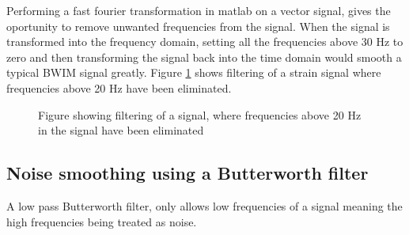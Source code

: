 Performing a fast fourier transformation in matlab on a vector signal, gives the oportunity to remove unwanted frequencies from the signal. When the signal is transformed into the frequency domain, setting all the frequencies above 30 Hz to zero and then transforming the signal back into the time domain would smooth a typical BWIM signal greatly.
Figure \ref{figure:filteredVSraw} shows filtering of a strain signal where frequencies above 20 Hz have been eliminated.
\begin{figure}[htpb]
	\begin{subfigure}[t]{0.9\textwidth}
		\centering
		
	\end{subfigure}
	\begin{subfigure}[t]{0.9\textwidth}
		\centering
		
	\end{subfigure}
	\caption{Figure showing filtering of a signal, where frequencies above 20 Hz in the signal have been eliminated }
	\label{figure:filteredVSraw}
\end{figure}
\subsection{Noise smoothing using a Butterworth filter}
A low pass Butterworth filter, only allows low frequencies of a signal meaning the high frequencies being treated as noise.
